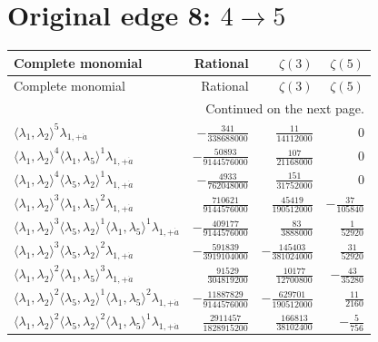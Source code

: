 \section{Original edge 8: $4\to 5$}
\begin{longtable}{@{}lrrr@{}}
\toprule
Complete monomial & Rational & $\zeta(3)$ & $\zeta(5)$ \\
\midrule\endfirsthead
\toprule Complete monomial & Rational & $\zeta(3)$ & $\zeta(5)$ \\
\midrule\endhead
\midrule\multicolumn{4}{r}{Continued on the next page.}\\\endfoot
\bottomrule\endlastfoot
$\langle\lambda_1,\lambda_2\rangle^{5}\lambda_{1,+\dot a}$ & $-\frac{341}{338688000}$ & $\frac{11}{14112000}$ & $0$ \\
$\langle\lambda_1,\lambda_2\rangle^{4}\langle\lambda_1,\lambda_5\rangle^{1}\lambda_{1,+\dot a}$ & $-\frac{50893}{9144576000}$ & $\frac{107}{21168000}$ & $0$ \\
$\langle\lambda_1,\lambda_2\rangle^{4}\langle\lambda_5,\lambda_2\rangle^{1}\lambda_{1,+\dot a}$ & $-\frac{4933}{762048000}$ & $\frac{151}{31752000}$ & $0$ \\
$\langle\lambda_1,\lambda_2\rangle^{3}\langle\lambda_1,\lambda_5\rangle^{2}\lambda_{1,+\dot a}$ & $\frac{710621}{9144576000}$ & $\frac{45419}{190512000}$ & $-\frac{37}{105840}$ \\
$\langle\lambda_1,\lambda_2\rangle^{3}\langle\lambda_5,\lambda_2\rangle^{1}\langle\lambda_1,\lambda_5\rangle^{1}\lambda_{1,+\dot a}$ & $-\frac{409177}{9144576000}$ & $\frac{83}{3888000}$ & $\frac{1}{52920}$ \\
$\langle\lambda_1,\lambda_2\rangle^{3}\langle\lambda_5,\lambda_2\rangle^{2}\lambda_{1,+\dot a}$ & $-\frac{591839}{3919104000}$ & $-\frac{145403}{381024000}$ & $\frac{31}{52920}$ \\
$\langle\lambda_1,\lambda_2\rangle^{2}\langle\lambda_1,\lambda_5\rangle^{3}\lambda_{1,+\dot a}$ & $\frac{91529}{304819200}$ & $\frac{10177}{12700800}$ & $-\frac{43}{35280}$ \\
$\langle\lambda_1,\lambda_2\rangle^{2}\langle\lambda_5,\lambda_2\rangle^{1}\langle\lambda_1,\lambda_5\rangle^{2}\lambda_{1,+\dot a}$ & $-\frac{11887829}{9144576000}$ & $-\frac{629701}{190512000}$ & $\frac{11}{2160}$ \\
$\langle\lambda_1,\lambda_2\rangle^{2}\langle\lambda_5,\lambda_2\rangle^{2}\langle\lambda_1,\lambda_5\rangle^{1}\lambda_{1,+\dot a}$ & $\frac{2911457}{1828915200}$ & $\frac{166813}{38102400}$ & $-\frac{5}{756}$ \\

\end{longtable}

